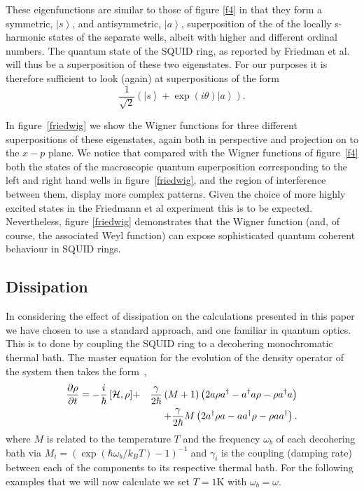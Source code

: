 \documentclass[12pt,a4paper,superscriptaddress,showpacs,floatfix,pra]{revtex4-2}
\begin{document}
These eigenfunctions are  similar to those of figure  \ref{f4} in that
they   form   a   symmetric,   $\left\vert   s\right\rangle   $,   and
antisymmetric, $\left\vert  a\right\rangle $, superposition  of the of
the  locally s-harmonic  states  of the  separate  wells, albeit  with
higher and different  ordinal numbers. The quantum state  of the SQUID
ring, as  reported by Friedman et  al.~\cite{FriedmanPCTL00} will thus
be a superposition  of these two eigenstates.  For  our purposes it is
therefore sufficient to look (again) at superpositions of the form
\begin{equation}
\frac{1}{\sqrt{2}}\left( \left\vert s\right\rangle +\exp (i\theta
)\left\vert a\right\rangle \right) .  \label{phaseequ2}
\end{equation}

In  figure~\ref{friedwig}  we  show  the Wigner  functions  for  three
different   superpositions  of  these   eigenstates,  again   both  in
perspective  and projection  on to  the $x-p$  plane.  We  notice that
compared with the Wigner  functions of figure~\ref{f4} both the states
of the macroscopic quantum superposition corresponding to the left and
right  hand   wells  in  figure~\ref{friedwig},  and   the  region  of
interference between  them, display more complex  patterns.  Given the
choice of more highly excited states in the Friedmann et al experiment
this   is  to  be   expected.   Nevertheless,   figure  \ref{friedwig}
demonstrates that the Wigner  function (and, of course, the associated
Weyl function) can expose  sophisticated quantum coherent behaviour in
SQUID rings.

\subsection{Dissipation}

In considering the effect of dissipation on the calculations presented
in  this paper  we have  chosen to  use a  standard approach,  and one
familiar {in} quantum optics. This  is to done by coupling the {SQUID}
ring to  a decohering monochromatic thermal bath.  The master equation
for the evolution of the density operator of the system then takes the
form~\cite{weiss1999},
\begin{eqnarray}
\frac{\partial \rho }{\partial t}=-\frac{i}{\hbar }\left[ \mathcal{H},\rho \right] &+&\frac{\gamma }{2\hbar }\left( M+1\right) \left( 2a\rho a^{\dagger
}-a^{\dagger }a\rho -\rho a^{\dagger }a\right)  \notag \\
&&+\frac{\gamma }{2\hbar }M\left( 2a^{\dagger }\rho a-aa^{\dagger }\rho
-\rho aa^{\dagger }\right) .  \label{dis}
\end{eqnarray}
where $M$ is related to  the temperature $T$ and the frequency $\omega
_{b}$  of each  decohering bath  via $M_{i}=\left(  \exp  \left( \hbar
\omega _{b}/k_{B}T\right)  -1\right) ^{-1}$  and $\gamma _{i}$  is the
coupling  (damping  rate)  between  each  of  the  components  to  its
respective thermal bath. For the {following} examples that we will now
calculate we set $T=1\mathrm{K}$ with $\omega_{b}=\omega$.
\end{document}
